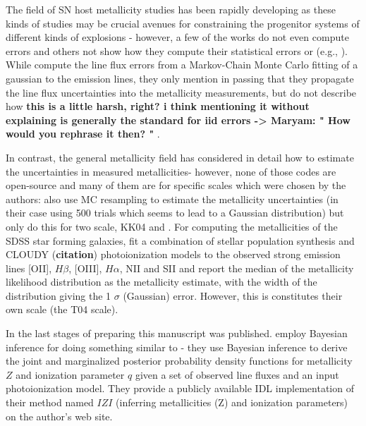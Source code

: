 \documentclass{emulateapj}
\begin{document}
The field of SN host metallicity studies has been rapidly developing as these kinds of studies may be crucial avenues for constraining the progenitor systems of different kinds of explosions - however, a few of the works do not even compute errors and others not show how they compute their statistical errors or  (e.g., \citet{anderson10,leloudas11,sanders12,leloudas14}). While \citet{sanders12} compute the line flux errors from a Markov-Chain Monte Carlo fitting of a gaussian to the emission lines, they only mention in passing that they propagate the line flux uncertainties into the metallicity measurements, but do not describe how {\bf this is a little harsh, right? i think mentioning it without explaining is generally the standard for iid errors -> Maryam: " How would you rephrase it then? " }.


In contrast, the general metallicity field has considered in detail how to estimate the uncertainties in measured metallicities- however, none of those codes are open-source and many of them are for specific scales which were chosen by the authors:  \citet{moustakas10} also use MC resampling to estimate the metallicity uncertainties (in their case using 500 trials which seems to lead to a Gaussian distribution) but only do this for two scale, KK04 and \citet{pilyugin05}. For computing the metallicities of the SDSS star forming galaxies, \citet{tremonti04} fit a combination of stellar population synthesis and CLOUDY ({\bf citation}) photoionization models to the observed strong emission lines [OII], $H\beta$, [OIII], $H\alpha$, NII and SII and report the median of the metallicity likelihood distribution as the metallicity estimate, with the width of the distribution giving the 1 $\sigma$ (Gaussian) error. However, this is constitutes their own scale (the T04 scale).

In the last stages of preparing this manuscript \citet{blanc15} was published.  \citet{blanc15} employ Bayesian inference for doing something similar to \citet{tremonti04} - they use Bayesian inference to derive the joint and marginalized posterior probability density functions for metallicity $Z$ and ionization parameter $q$ given a set of observed line fluxes and an input photoionization model. They provide a publicly available IDL implementation of their method named $IZI$ (inferring metallicities (Z) and ionization parameters) on the author's web site.
\end{document}
